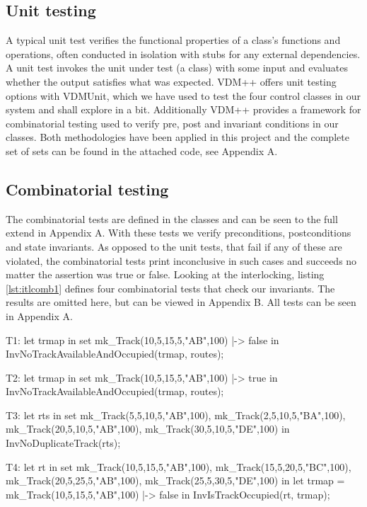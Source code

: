 \documentclass[preprint,12pt]{elsarticle}
\begin{document}
\subsection{Unit testing}
A typical unit test verifies the functional properties of a class's functions and operations, often conducted in isolation with stubs for any external dependencies. A unit test invokes the unit under test (a class) with some input and evaluates whether the output satisfies what was expected. VDM++ offers unit testing options with VDMUnit, which we have used to test the four control classes in our system and shall explore in a bit. Additionally VDM++ provides a framework for combinatorial testing used to verify pre, post and invariant conditions in our classes. Both methodologies have been applied in this project and the complete set of sets can be found in the attached code, see Appendix A.

\subsection{Combinatorial testing}
The combinatorial tests are defined in the classes and can be seen to the full extend in Appendix A. With these tests we verify preconditions, postconditions and state invariants. As opposed to the unit tests, that fail if any of these are violated, the combinatorial tests print inconclusive in such cases and succeeds no matter the assertion was true or false. Looking at the interlocking, listing \ref{lst:itlcomb1} defines four combinatorial tests that check our invariants. The results are omitted here, but can be viewed in Appendix B. All tests can be seen in Appendix A.

\begin{vdmsl}[label=lst:itlcomb1,caption={Four combinatorial tests that exercise our invariant functions in the Interlocking class.}]
	T1: let trmap in set
	 {{mk_Track(10,5,15,5,"AB",100) |-> false}} in
	InvNoTrackAvailableAndOccupied(trmap, routes);
	
	T2: let trmap in set
	 {{mk_Track(10,5,15,5,"AB",100) |-> true}} in
	InvNoTrackAvailableAndOccupied(trmap, routes);
	
	T3: let rts in set {{{mk_Track(5,5,10,5,"AB",100),
		mk_Track(2,5,10,5,"BA",100)},
		{mk_Track(20,5,10,5,"AB",100),
		mk_Track(30,5,10,5,"DE",100)}}} in
			InvNoDuplicateTrack(rts);
	
	T4: let rt in set {{mk_Track(10,5,15,5,"AB",100),
			mk_Track(15,5,20,5,"BC",100)},
			{mk_Track(20,5,25,5,"AB",100),
			 mk_Track(25,5,30,5,"DE",100)}} in
	let trmap = {mk_Track(10,5,15,5,"AB",100) |-> false} in
	InvIsTrackOccupied(rt, trmap);
\end{vdmsl}
\end{document}
